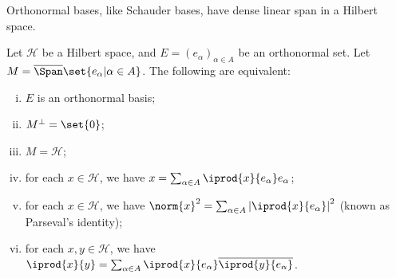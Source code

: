 \documentclass[10pt]{mypackage}
\begin{document}
Orthonormal bases, like Schauder bases, have dense linear span in a Hilbert space.
\begin{theorem}
  Let $\mathcal{H}$ be a Hilbert space, and $E = \left(e_{\alpha}\right)_{\alpha \in A}$ be an orthonormal set. Let $M = \overline{\Span}\set{e_{\alpha} | \alpha \in A}$. The following are equivalent:
  \begin{enumerate}[(i)]
    \item $E$ is an orthonormal basis;
    \item $M^{\perp} = \set{0}$;
    \item $M = \mathcal{H}$;
    \item for each $x\in \mathcal{H}$, we have $x = \sum_{\alpha \in A} \iprod{x}{e_{\alpha}}e_{\alpha}$;
    \item for each $x\in \mathcal{H}$, we have $\norm{x}^2 = \sum_{\alpha \in A} \left\vert \iprod{x}{e_{\alpha}} \right\vert^2$ (known as Parseval's identity);
    \item for each $x,y\in \mathcal{H}$, we have $ \iprod{x}{y} = \sum_{\alpha \in A} \iprod{x}{e_{\alpha}} \overline{ \iprod{y}{e_{\alpha}} }$.
  \end{enumerate}
\end{theorem}
\end{document}

